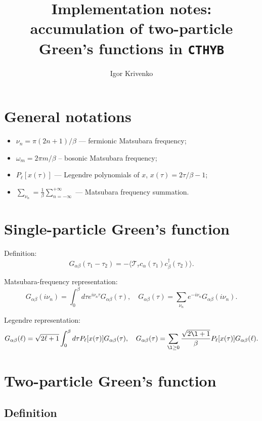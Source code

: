 \documentclass[a4paper,12pt]{article}
\newcommand{\aver}[1]{\ensuremath{\langle#1\rangle}}
\renewcommand{\t}{\ensuremath{\tau}}
\newcommand{\w}{\ensuremath{\omega}}
\newcommand{\TT}{\ensuremath{\mathcal{T}_\t}}
\begin{document}
\title{Implementation notes: accumulation of two-particle Green's functions in \texttt{CTHYB}}
\author{Igor Krivenko}
\maketitle

\section{General notations}
\begin{itemize}
	\item $\nu_n = \pi(2n+1)/\beta$ --- fermionic Matsubara frequency;
	\item $\w_m = 2\pi m/\beta$ -- bosonic Matsubara frequency;
	\item $P_\ell[x(\t)]$ --- Legendre polynomials of $x$, $x(\t) = 2\t/\beta - 1$;
	\item $\sum_{\nu_n} = \frac{1}{\beta}\sum_{n=-\infty}^{+\infty}$ ---
		  Matsubara frequency summation.
\end{itemize}

\section{Single-particle Green's function}

Definition:
\begin{equation}
	G_{\alpha\beta}(\t_1-\t_2) = -\aver{\TT c_\alpha(\t_1) c^\dag_\beta(\t_2)}.
\end{equation}

Matsubara-frequency representation:
\begin{equation}
	G_{\alpha\beta}(i\nu_n) = \int_0^\beta d\t e^{i\nu_n\t} G_{\alpha\beta}(\t),
	\quad
	G_{\alpha\beta}(\t) = \sum_{\nu_n} e^{-i\nu_n} G_{\alpha\beta}(i\nu_n).
\end{equation}

Legendre representation:
\begin{equation}
	G_{\alpha\beta}(\ell) = \sqrt{2\ell+1}\int_0^\beta d\t P_\ell[x(\t)] G_{\alpha\beta}(\t),
	\quad
	G_{\alpha\beta}(\t) = \sum_{\l\ge 0} \frac{\sqrt{2\l+1}}{\beta} P_\ell[x(\t)] G_{\alpha\beta}(\ell).
\end{equation}

\section{Two-particle Green's function}
\subsection{Definition}
\end{document}
